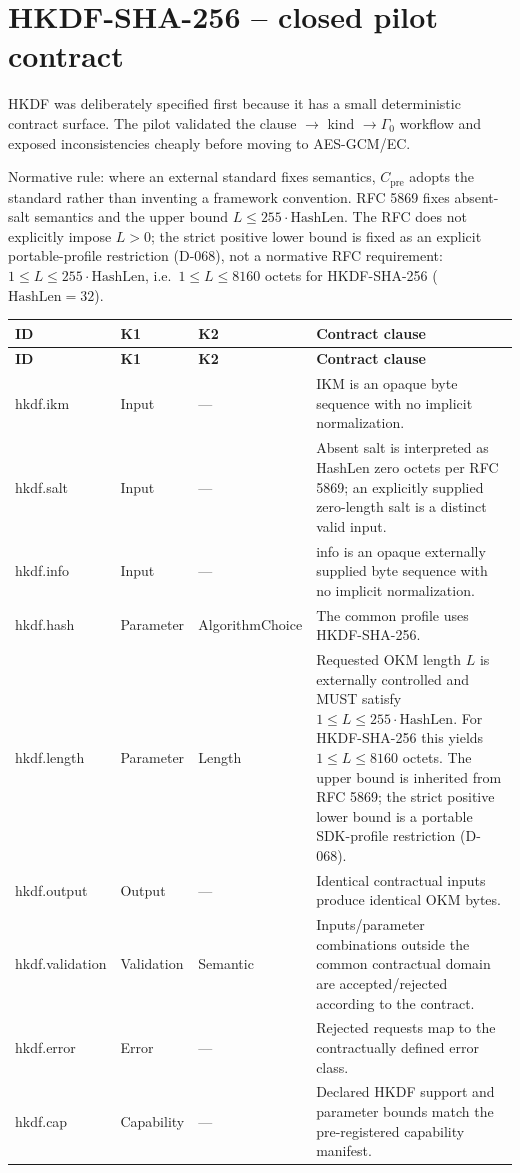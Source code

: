 \documentclass[11pt,a4paper]{article}
\begin{document}
\section{HKDF-SHA-256 -- closed pilot contract}
HKDF was deliberately specified first because it has a small deterministic contract surface. The pilot validated the clause $\to$ kind $\to \Gamma_0$ workflow and exposed inconsistencies cheaply before moving to AES-GCM/EC.

Normative rule: where an external standard fixes semantics, $C_{\text{pre}}$ adopts the standard rather than inventing a framework convention. RFC 5869 fixes absent-salt semantics and the upper bound $L\le 255\cdot\text{HashLen}$. The RFC does not explicitly impose $L>0$; the strict positive lower bound is fixed as an explicit portable-profile restriction (D-068), not a normative RFC requirement: $1\le L\le 255\cdot\text{HashLen}$, i.e.\ $1\le L\le 8160$ octets for HKDF-SHA-256 ($\text{HashLen}=32$).

\begin{longtable}{@{}L{0.23\textwidth}L{0.23\textwidth}L{0.23\textwidth}L{0.23\textwidth}@{}}
\toprule
\textbf{ID} & \textbf{K1} & \textbf{K2} & \textbf{Contract clause}\\
\midrule\endfirsthead
\toprule
\textbf{ID} & \textbf{K1} & \textbf{K2} & \textbf{Contract clause}\\
\midrule\endhead
hkdf.ikm & Input & --- & IKM is an opaque byte sequence with no implicit normalization.\\
hkdf.salt & Input & --- & Absent salt is interpreted as HashLen zero octets per RFC 5869; an explicitly supplied zero-length salt is a distinct valid input.\\
hkdf.info & Input & --- & info is an opaque externally supplied byte sequence with no implicit normalization.\\
hkdf.hash & Parameter & AlgorithmChoice & The common profile uses HKDF-SHA-256.\\
hkdf.length & Parameter & Length & Requested OKM length $L$ is externally controlled and MUST satisfy $1\le L\le 255\cdot\text{HashLen}$. For HKDF-SHA-256 this yields $1\le L\le 8160$ octets. The upper bound is inherited from RFC 5869; the strict positive lower bound is a portable SDK-profile restriction (D-068).\\
hkdf.output & Output & --- & Identical contractual inputs produce identical OKM bytes.\\
hkdf.validation & Validation & Semantic & Inputs/parameter combinations outside the common contractual domain are accepted/rejected according to the contract.\\
hkdf.error & Error & --- & Rejected requests map to the contractually defined error class.\\
hkdf.cap & Capability & --- & Declared HKDF support and parameter bounds match the pre-registered capability manifest.\\
\bottomrule
\end{longtable}
\end{document}
